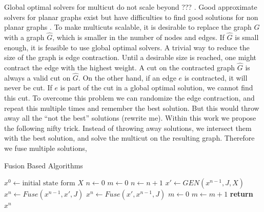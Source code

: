 \documentclass[10pt,twocolumn,letterpaper]{article}
\begin{document}
Global optimal solvers for multicut do not scale beyond ??? \cite{???}.
Good approximate solvers for planar graphs exist \cite{beier_2014_cvpr,yarkony_2012_eccv} 
but have difficulties to find good solutions for non planar graphs \cite{beier_2014_cvpr}.
%
To make multicuts scalable, it is desirable to replace the graph $G$
with a graph $\hat{G}$, which is smaller in the number of nodes and edges. 
If $\hat{G}$ is small enough, it is feasible to use global optimal solvers.
%
A trivial way to reduce the size of the graph  is edge contraction.
Until a desirable size is reached, one might contract the edge with
the highest weight. A cut on the contracted graph  $\hat{G}$ is always
a valid cut on $\hat{G}$.
%
On the other hand, if an edge $e$ is contracted, it will never be cut.
If $e$ is part of the cut in a global optimal solution, we cannot find
this cut.
%
To overcome this problem  we can randomize the edge contraction,
and repeat this multiple times and remember the best solution.
%
But this would throw away all the ``not the best'' solutions (rewrite me).
Within this work we propose the following nifty trick.
Instead of throwing away solutions, we intersect them with the 
best solution, and solve the multicut on the resulting
graph.
Therefore we fuse multiple solutions,



\begin{algorithm}
\begin{scriptsize}
\caption{Fusion Based Algorithms}\label{alg:fusion}
\begin{algorithmic}[1]
\State $x^0 \gets \textrm{initial state form } X$
\State $n \gets 0 $                                 
\State $m \gets 0 $                                 
\State $n \gets n+1$ 
 \State $x'\gets GEN(x^{n-1},J,X)$                    
   \State $x^{n} \gets Fuse(x^{n-1},x',J)$             
 \Else
   \State $x^{n} \gets Fuse(x',x^{n-1},J)$
 \EndIf
   \State $m \gets 0$                                 
 \Else
   \State $m \gets m+1$                               
 \EndIf
\EndWhile
\State \textbf{return} $x^n$
\EndProcedure
\end{algorithmic}
\end{scriptsize}
\end{algorithm}
\end{document}
